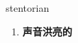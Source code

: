 
\begin{frame}
{\huge stentorian}
\begin{center}
\begin{enumerate}\Large
  \item \textbf{声音洪亮的}
\end{enumerate}
\end{center}
\end{frame}
